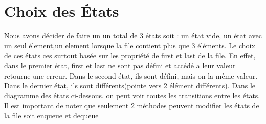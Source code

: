 \documentclass{article}
\begin{document}
\section{Choix des États}
Nous avons décider de faire un un total de 3 états soit : un état vide, un état avec un seul élement,un element lorsque la file contient plus que 3 éléments.
Le choix de ces états ces surtout basée sur les propriété de first et last de la file.
En effet, dans le premier état, first et last ne sont pas défini et accédé a leur valeur retourne une erreur.
Dans le second état, ils sont défini, mais on la même valeur.
Dans le dernier état, ils sont différents(pointe vers 2 élément différents).
Dans le diagramme des états ci-dessous, on peut voir toutes les transitions entre les états.
Il est important de noter que seulement 2 méthodes peuvent modifier les états de la file soit enqueue et dequeue
\end{document}
